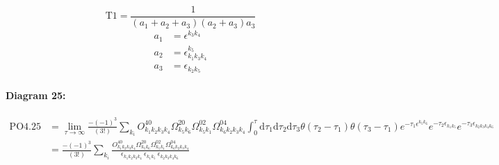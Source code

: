 \documentclass[10pt,a4paper]{article}
\begin{document}
\begin{equation}
\text{T}1 = \frac{1}{(a_1+ a_2+ a_3)(a_2+ a_3)a_3}\end{equation}
\begin{align*}
a_1 &= \epsilon^{k_{3}k_{4}}_{}\\
a_2 &= \epsilon^{k_{5}}_{k_{1}k_{3}k_{4}}\\
a_3 &= \epsilon^{}_{k_{2}k_{5}}
\end{align*}
\paragraph{Diagram 25:}
\begin{align}
\text{PO}4.25
&= \lim\limits_{\tau \to \infty}\frac{-(-1)^3 }{(3!)}\sum_{k_i}O^{40}_{k_{1}k_{2}k_{3}k_{4}} \Omega^{20}_{k_{5}k_{6}} \Omega^{02}_{k_{5}k_{1}} \Omega^{04}_{k_{6}k_{2}k_{3}k_{4}} \int_{0}^{\tau}\mathrm{d}\tau_1\mathrm{d}\tau_2\mathrm{d}\tau_3\theta(\tau_2-\tau_1) \theta(\tau_3-\tau_1) e^{-\tau_1 \epsilon^{k_{5}k_{6}}_{}}e^{-\tau_2 \epsilon^{}_{k_{1}k_{5}}}e^{-\tau_3 \epsilon^{}_{k_{2}k_{3}k_{4}k_{6}}}
 \nonumber \\
&= \frac{-(-1)^3 }{(3!)}\sum_{k_i}\frac{O^{40}_{k_{1}k_{2}k_{3}k_{4}} \Omega^{20}_{k_{5}k_{6}} \Omega^{02}_{k_{5}k_{1}} \Omega^{04}_{k_{6}k_{2}k_{3}k_{4}} }{\epsilon^{}_{k_{1}k_{2}k_{3}k_{4}}\ \epsilon^{}_{k_{1}k_{5}}\ \epsilon^{}_{k_{2}k_{3}k_{4}k_{6}}\ } 
\end{align}
\end{document}
